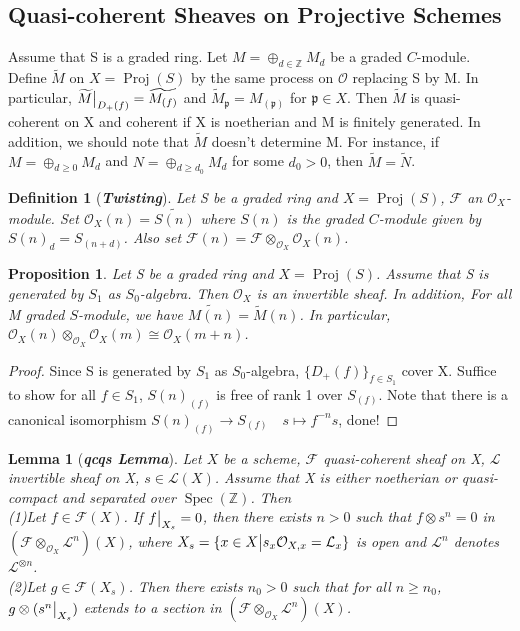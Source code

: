 \documentclass{ctexart}
\newtheorem{definition}{Definition}[section]
\newtheorem{proposition}{Proposition}[section]
\newtheorem{lemma}{Lemma}[section]
\newcommand{\spec}{\operatorname{Spec}}
\newcommand{\proj}{\operatorname{Proj}}
\begin{document}
\subsection{Quasi-coherent Sheaves on Projective Schemes}
Assume that S is a graded ring.
Let $M = \oplus_{d\in \mathbb{Z}} M_{d}$ be a graded $C$-module.
Define $\widetilde{M}$ on $X = \proj(S)$ by the same process on $\mathcal{O}$ replacing S by M.
In particular, $\widetilde{M}\big{|}_{D_{+}(f)} = \widetilde{M_{(f)}}$ and $\widetilde{M}_{\mathfrak{p}} = M_{(\mathfrak{p})}$ for $\mathfrak{p}\in X$.
Then $\widetilde{M}$ is quasi-coherent on X and coherent if X is noetherian and M is finitely generated.
In addition, we should note that $\widetilde{M}$ doesn't determine M.
For instance, if $M = \oplus_{d \ge 0} M_{d}$ and $N = \oplus_{d \ge d_{0}} M_{d}$ for some $d_{0} > 0$, then $\widetilde{M} = \widetilde{N}$.
\begin{definition}[\textbf{\emph{Twisting}}]
    Let S be a graded ring and $X = \proj(S)$, $\mathcal{F}$ an $\mathcal{O}_{X}$-module.
    Set $\mathcal{O}_{X}(n) = \widetilde{S(n)}$ where $S(n)$ is the graded $C$-module given by $S(n)_{d} = S_(n + d)$.
    Also set $\mathcal{F}(n) = \mathcal{F} \otimes_{\mathcal{O}_{X}} \mathcal{O}_{X}(n)$.
\end{definition}
\begin{proposition}
    Let S be a graded ring and $X = \proj(S)$.
    Assume that S is generated by $S_{1}$ as $S_{0}$-algebra.
    Then $\mathcal{O}_{X}$ is an invertible sheaf.
    In addition, For all M graded $S$-module, we have $\widetilde{M(n)} = \widetilde{M}(n)$.
    In particular, $\mathcal{O}_{X}(n) \otimes_{\mathcal{O}_{X}} \mathcal{O}_{X}(m) \cong \mathcal{O}_{X}(m + n)$.
    \label{Proposition 6.8}
\end{proposition}
\begin{proof}
    Since S is generated by $S_{1}$ as $S_{0}$-algebra, $\{D_{+}(f)\}_{f\in S_{1}}$ cover X.
    Suffice to show for all $f\in S_{1}$, $S(n)_{(f)}$ is free of rank 1 over $S_{(f)}$.
    Note that there is a canonical isomorphism $S(n)_{(f)} \longrightarrow S_{(f)}\quad s \longmapsto f^{-n}s$, done! 
\end{proof}
\begin{lemma}[\textbf{\emph{qcqs Lemma}}]
    Let $X$ be a scheme, $\mathcal{F}$ quasi-coherent sheaf on X, $\mathcal{L}$ invertible sheaf on X, $s\in \mathcal{L}(X)$.
    Assume that X is either noetherian or quasi-compact and separated over $\spec(\mathbb{Z})$.
    Then \\
    (1)Let $f\in \mathcal{F}(X)$.
    If $f\big{|}_{X_{s}} = 0$, then there exists $n > 0$ such that $f \otimes s^{n} = 0$ in $(\mathcal{F} \otimes_{\mathcal{O}_{X}} \mathcal{L}^{n})(X)$,
    where $X_{s} = \{x\in X \big{|} s_{x}\mathcal{O}_{X, x} = \mathcal{L}_{x}\}$ is open and $\mathcal{L}^{n}$ denotes $\mathcal{L}^{\otimes n}$. \\
    (2)Let $g\in \mathcal{F}(X_{s})$.
    Then there exists $n_{0} > 0$ such that for all $n \ge n_{0}$,
    $g \otimes (s^{n}\big{|}_{X_{s}})$ extends to a section in $(\mathcal{F} \otimes_{\mathcal{O}_{X}} \mathcal{L}^{n})(X)$.
    \label{Lemma 6.3}
\end{lemma}
\end{document}
